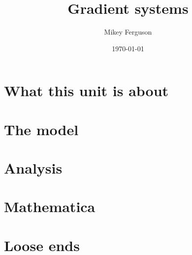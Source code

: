 \documentclass[11pt]{article}
\title{Gradient systems}
\author{Mikey Ferguson}
\date{\today}
\begin{document}
\maketitle
\tableofcontents
\bigskip

\section{What this unit is about}

\section{The model}

\section{Analysis}

\section{Mathematica}

\section{Loose ends}
\end{document}
